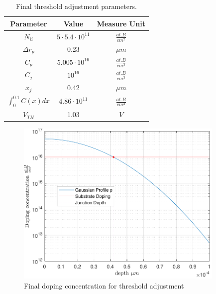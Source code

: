 \documentclass[11pt,a4paper]{article}
\begin{document}
	\begin{table}
		\caption{Final threshold adjustment parameters.}
		\centering
		\begin{tabular}[H]{|| c | c | c ||}
			\hline
			Parameter & Value & Measure Unit \\ [0.5ex] 
			\hline\hline
			$N_{ii}$ & $ 5\cdot5.4\cdot 10^{11}$ & $\frac{at.B}{cm^2}$\\
			\hline			
			$\Delta r_p$ & 0.23 & $\mu m$\\
			\hline	
			$C_p$ & $5.005\cdot10^{16}$ & $\frac{at.B}{cm^3}$\\
			\hline		
			$C_j$ & $10^{16}$ & $\frac{at.B}{cm^3}$\\
			\hline			
			$x_j$ & 0.42 & $\mu m$\\
			\hline		
			$\int_{0}^{0.1}C(x)dx$ & $4.86\cdot10^{11}$ & $\frac{at.B}{cm^3}$\\
			\hline
			$V_{TH}$ & 1.03 & $V$\\
			\hline			
		\end{tabular}
		\label{adjparamfinal}
	\end{table}
	\begin{figure}
		\centering
		\includegraphics[width=100mm]{dopingadj2}
		\caption{Final doping concentration for threshold adjustment}
		\label{dopingadj2}
	\end{figure}
\end{document}

